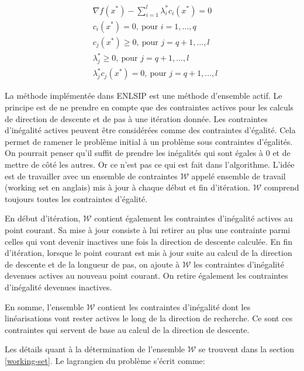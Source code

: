 \documentclass[a4paper,11pt]{article}
\numberwithin{equation}{section}
\begin{document}
\begin{equation} \label{kkt}
\begin{aligned}
&\nabla f(x^{*}) - \sum\limits_{i=1}^{l} \lambda_{i}^{*}c_{i}(x^{*})= 0\\
&c_{i}(x^{*}) = 0, \ \text{pour } i=1,\ldots,q\\
&c_{j}(x^{*}) \geq 0, \ \text{pour } j=q+1,\ldots,l\\
&\lambda_{j}^{*} \geq 0, \ \text{pour } j=q+1,\ldots,l\\
&\lambda_{j}^{*} c_{j}(x^{*}) = 0, \ \text{pour } j=q+1,\ldots,l
\end{aligned}
\end{equation}

La méthode implémentée dans ENLSIP est une méthode d'ensemble actif. Le principe est de ne prendre en compte que des contraintes actives pour les calculs de direction de descente et de pas à une itération donnée. Les contraintes d'inégalité actives peuvent être considérées comme des contraintes d'égalité. Cela permet de ramener le problème initial à un problème sous contraintes d'égalités. On pourrait penser qu'il suffit de prendre les inégalités qui sont égales à $0$ et de mettre de côté les autres. Or ce n'est pas ce qui est fait dans l'algorithme. L'idée est de travailler avec un ensemble de contraintes $\mathcal{W}$ appelé ensemble de travail (working set en anglais) mis à jour à chaque début et fin d'itération. $\mathcal{W}$ comprend toujours toutes les contraintes d'égalité.

En début d'itération, $\mathcal{W}$ contient également les contraintes d'inégalité actives au point courant. Sa mise à jour consiste à lui retirer au plus une contrainte parmi celles qui vont devenir inactives une fois la direction de descente calculée.  En fin d'itération, lorsque le point courant est mis à jour suite au calcul de la direction de descente et de la longueur de pas, on ajoute à $\mathcal{W}$ les contraintes d'inégalité devenues actives au nouveau point courant. On retire également les contraintes d'inégalité devenues inactives.

En somme, l'ensemble $\mathcal{W}$ contient les contraintes d'inégalité dont les linéarisations vont rester actives le long de la direction de recherche. Ce sont ces contraintes qui servent de base au calcul de la direction de descente.


Les détails quant à la détermination de l'ensemble $\mathcal{W}$ se trouvent dans la section \ref{working-set}. Le lagrangien du problème s'écrit comme: 
\end{document}

